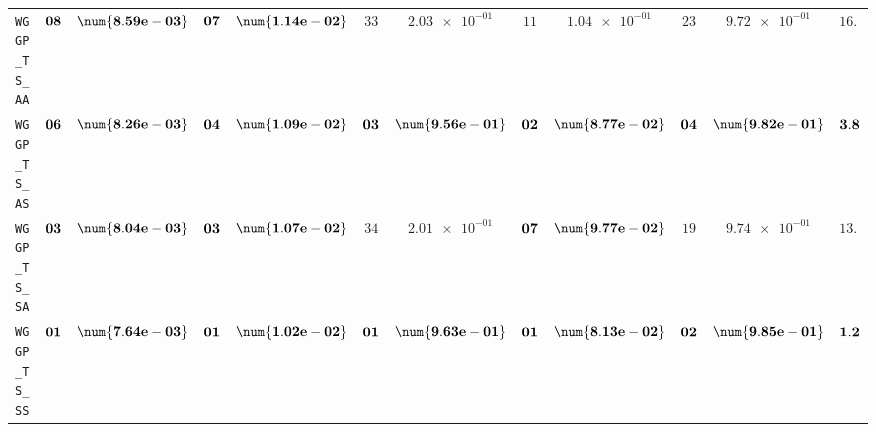 \begin{xltabular}{\textwidth}{l||cC|cC|cC|cC|cC||c}
	\texttt{WGGP\_TS\_AA} & $\bf 08$ & $\bf \num{8.59e-03}$ & $\bf 07$ & $\bf \num{1.14e-02}$ & $ 33$ & $ \num{2.03e-01}$ & $ 11$ & $ \num{1.04e-01}$ & $ 23$ & $ \num{9.72e-01}$ & $ 16.4$  \\
	\texttt{WGGP\_TS\_AS} & $\bf 06$ & $\bf \num{8.26e-03}$ & $\bf 04$ & $\bf \num{1.09e-02}$ & $\bf 03$ & $\bf \num{9.56e-01}$ & $\bf 02$ & $\bf \num{8.77e-02}$ & $\bf 04$ & $\bf \num{9.82e-01}$ & $\bf 3.8$  \\
	\texttt{WGGP\_TS\_SA} & $\bf 03$ & $\bf \num{8.04e-03}$ & $\bf 03$ & $\bf \num{1.07e-02}$ & $ 34$ & $ \num{2.01e-01}$ & $\bf 07$ & $\bf \num{9.77e-02}$ & $ 19$ & $ \num{9.74e-01}$ & $ 13.2$  \\
	\texttt{WGGP\_TS\_SS} & $\bf 01$ & $\bf \num{7.64e-03}$ & $\bf 01$ & $\bf \num{1.02e-02}$ & $\bf 01$ & $\bf \num{9.63e-01}$ & $\bf 01$ & $\bf \num{8.13e-02}$ & $\bf 02$ & $\bf \num{9.85e-01}$ & $\bf 1.2$  \\
\end{xltabular}
